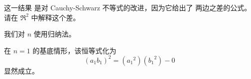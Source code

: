      这一结果 
     是对 Cauchy-Schwarz 不等式的改进，因为它给出了
     两边之差的公式。
     请在 \( \Re^2 \) 中解释这个差。
     \begin{answer}
       我们对 \( n \) 使用归纳法。

       在 \( n=1 \) 的基底情形，该恒等式化为
       \begin{equation*}
          (a_1b_1)^2=({a_1}^2)({b_1}^2)-0
       \end{equation*}
       显然成立。


\end{answer}
